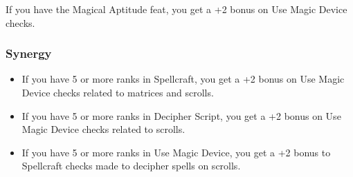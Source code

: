 If you have the Magical Aptitude feat, you get a +2 bonus on Use Magic Device checks.
\subsubsection{Synergy}
\begin{itemize}
\item If you have 5 or more ranks in Spellcraft, you get a +2 bonus on Use Magic Device checks related to matrices and scrolls.
\item If you have 5 or more ranks in Decipher Script, you get a +2 bonus on Use Magic Device checks related to scrolls.
\item If you have 5 or more ranks in Use Magic Device, you get a +2 bonus to Spellcraft checks made to decipher spells on scrolls.
\end{itemize}
